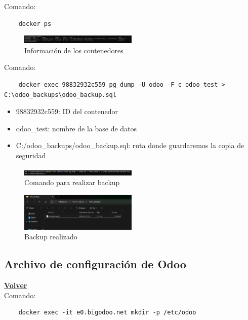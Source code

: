 \documentclass[a4paper,12pt]{article}
\begin{document}
Comando: 
\begin{verbatim}
    docker ps
\end{verbatim}

\begin{figure}[h!]
    \centering
    \includegraphics[width=0.5\textwidth]{pr2odoo79-dockerPS.png}
    \caption{Información de los contenedores}
\end{figure}
\FloatBarrier

Comando: 
\begin{verbatim}
    docker exec 98832932c559 pg_dump -U odoo -F c odoo_test > C:\odoo_backups\odoo_backup.sql 
\end{verbatim}

\begin{itemize}
    \item 98832932c559: ID del contenedor
    \item odoo\_test: nombre de la base de datos
    \item C:/odoo\_backups/odoo\_backup.sql: ruta donde guardaremos la copia de seguridad
\end{itemize}

\begin{figure}[h!]
    \centering
    \includegraphics[width=0.5\textwidth]{pr2odoo80-comandoBackup.png}
    \caption{Comando para realizar backup}
\end{figure}
\FloatBarrier

\begin{figure}[h!]
    \centering
    \includegraphics[width=0.5\textwidth]{pr2odoo81-backupRealizado.png}
    \caption{Backup realizado}
\end{figure}
\FloatBarrier

\subsection{Archivo de configuración de Odoo}
\hyperlink{anchor-indice}{\textbf{Volver}}\\

Comando: 
\begin{verbatim}
    docker exec -it e0.bigodoo.net mkdir -p /etc/odoo
\end{verbatim}
\end{document}
